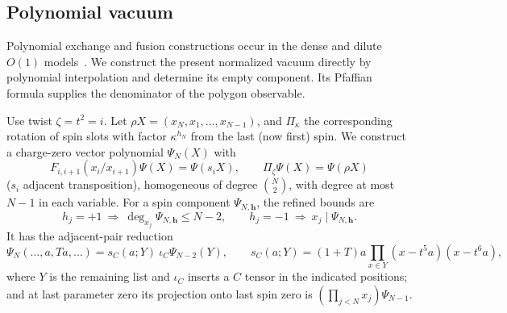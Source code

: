 \subsection{Polynomial vacuum}\label{c01-c1-polynomial-vacuum}

Polynomial exchange and fusion constructions occur in the dense and dilute $O(1)$ models~\cite{DiFrancescoZinnJustin2005,GarbaliNienhuis2017Ground,GarbaliNienhuis2017Sum}. We construct the present normalized vacuum directly by polynomial interpolation and determine its empty component. Its Pfaffian formula supplies the denominator of the polygon observable.

\begin{proposition}\label{prop:pv:vacuum}
Use twist \(\zeta=t^2=i\). Let \(\rho X=(x_N,x_1,\ldots,x_{N-1})\), and \(\Pi_\kappa\) the corresponding rotation of spin slots with factor \(\kappa^{h_N}\) from the last (now first) spin. We construct a charge-zero vector polynomial \(\Psi_N(X)\) with
\[
 F_{i,i+1}(x_i/x_{i+1})\Psi(X)=\Psi(s_i X),\qquad
 \Pi_\zeta\Psi(X)=\Psi(\rho X)
\]
(\(s_i\) adjacent transposition), homogeneous of degree \(\binom N2\),
with degree at most \(N-1\) in each variable. For a spin component
\(\Psi_{N,\boldsymbol h}\), the refined bounds are
\[
 h_j=+1\ \Longrightarrow\ \deg_{x_j}\Psi_{N,\boldsymbol h}\le N-2,
 \qquad
 h_j=-1\ \Longrightarrow\ x_j\mid\Psi_{N,\boldsymbol h}.
\]
It has the adjacent-pair reduction
\[
 \Psi_N(\ldots,a,Ta,\ldots)=s_C(a;Y)\ \iota_C \Psi_{N-2}(Y),
 \qquad
 s_C(a;Y)=(1+T)a\prod_{x\in Y}(x-t^5a)(x-t^6a),
\]
where \(Y\) is the remaining list and \(\iota_C\) inserts a \(C\) tensor in the indicated positions; and at last parameter zero its projection onto last spin zero is \((\prod_{j<N}x_j)\Psi_{N-1}\).

\end{proposition}

